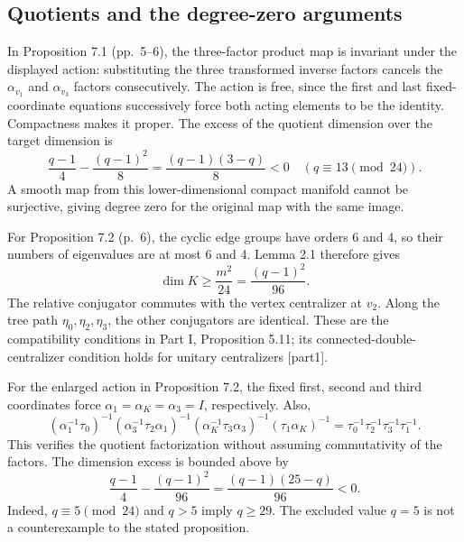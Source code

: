 \documentclass[10pt]{article}
\begin{document}
\subsection*{Quotients and the degree-zero arguments}
In Proposition 7.1 (pp. 5–6), the three-factor product map is invariant under the displayed action: substituting the three transformed inverse factors cancels the \(\alpha_{v_1}\) and \(\alpha_{v_3}\) factors consecutively. The action is free, since the first and last fixed-coordinate equations successively force both acting elements to be the identity. Compactness makes it proper. The excess of the quotient dimension over the target dimension is \[\frac{q-1}{4}-\frac{(q-1)^2}{8}
 =\frac{(q-1)(3-q)}8<0
 \quad(q\equiv13\pmod {24}).\] A smooth map from this lower-dimensional compact manifold cannot be surjective, giving degree zero for the original map with the same image.\par
For Proposition 7.2 (p. 6), the cyclic edge groups have orders 6 and 4, so their numbers of eigenvalues are at most 6 and 4. Lemma 2.1 therefore gives \[\dim K\geq \frac{m^2}{24}=\frac{(q-1)^2}{96}.\] The relative conjugator commutes with the vertex centralizer at \(v_2\). Along the tree path \(\eta_0,\eta_2,\eta_3\), the other conjugators are identical. These are the compatibility conditions in Part I, Proposition 5.11; its connected-double-centralizer condition holds for unitary centralizers [part1].\par
For the enlarged action in Proposition 7.2, the fixed first, second and third coordinates force \(\alpha_1=\alpha_K=\alpha_3=I\), respectively. Also, \[(\alpha_1^{-1}\tau_0)^{-1}
 (\alpha_3^{-1}\tau_2\alpha_1)^{-1}
 (\alpha_K^{-1}\tau_3\alpha_3)^{-1}
 (\tau_1\alpha_K)^{-1}
 =\tau_0^{-1}\tau_2^{-1}\tau_3^{-1}\tau_1^{-1}.\] This verifies the quotient factorization without assuming commutativity of the factors. The dimension excess is bounded above by \[\frac{q-1}{4}-\frac{(q-1)^2}{96}
 =\frac{(q-1)(25-q)}{96}<0.\] Indeed, \(q\equiv5\pmod {24}\) and \(q>5\) imply \(q\geq29\). The excluded value \(q=5\) is not a counterexample to the stated proposition.\par
\end{document}
